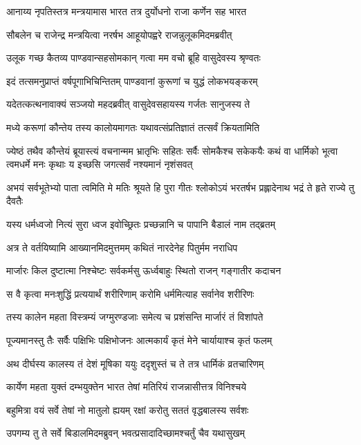 \twolineshloka
{आनाय्य नृपतिस्तत्र मन्त्रयामास भारत}
{तत्र दुर्योधनो राजा कर्णेन सह भारत}


\twolineshloka
{सौबलेन च राजेन्द्र मन्त्रयित्वा नरर्षभ}
{आहूयोपह्वरे राजन्नुलूकमिदमब्रवीत्}


\twolineshloka
{उलूक गच्छ कैतव्य पाण्डवान्सहसोमकान्}
{गत्वा मम वचो ब्रूहि वासुदेवस्य श्रृण्वतः}


\twolineshloka
{इदं तत्समनुप्राप्तं वर्षपूगाभिचिन्तितम्}
{पाण्डवानां कुरूणां च युद्धं लोकभयङ्करम्}


\twolineshloka
{यदेतत्कत्थनावाक्यं सञ्जयो महदब्रवीत्}
{वासुदेवसहायस्य गर्जतः सानुजस्य ते}


\twolineshloka
{मध्ये करूणां कौन्तेय तस्य कालोयमागतः}
{यथावत्संप्रतिज्ञातं तत्सर्वं क्रियतामिति}


ज्येष्ठं तथैव कौन्तेयं ब्रूयास्त्यं वचनान्मम
\threelineshloka
{भ्रातृभिः सहितः सर्वैः सोमकैश्च सकेकयैः}
{कथं वा धार्मिको भूत्वा त्वमधर्मे मनः कृथाः}
{य इच्छसि जगत्सर्वं नश्यमानं नृशंसवत्}


अभयं सर्वभूतेभ्यो पाता त्वमिति मे मतिः
\twolineshloka
{श्रूयते हि पुरा गीतः श्लोकोऽयं भरतर्षभ}
{प्रह्लादेनाथ भद्रं ते हृते राज्ये तु दैवतैः}


\twolineshloka
{यस्य धर्मध्वजो नित्यं सुरा ध्वज इवोच्छ्रितः}
{प्रच्छन्नानि च पापानि बैडालं नाम तद्ब्रतम्}


\twolineshloka
{अत्र ते वर्तयिष्यामि आख्यानमिदमुत्तमम्}
{कथितं नारदेनेह पितुर्मम नराधिप}


\twolineshloka
{मार्जारः किल दुष्टात्मा निश्चेष्टः सर्वकर्मसु}
{ऊर्ध्वबाहुः स्थितो राजन् गङ्गातीर कदाचन}


\twolineshloka
{स वै कृत्वा मनःशुद्धिं प्रत्ययार्थं शरीरिणाम्}
{करोमि धर्ममित्याह सर्वानेव शरीरिणः}


\twolineshloka
{तस्य कालेन महता विस्त्रम्यं जग्मुरण्डजाः}
{समेत्य च प्रशंसन्ति मार्जारं तं विशांपते}


\twolineshloka
{पूज्यमानस्तु तैः सर्वैः पक्षिभिः पक्षिभोजनः}
{आत्मकार्यं कृतं मेने चार्यायाश्च कृतं फलम्}


\twolineshloka
{अथ दीर्घस्य कालस्य तं देशं मूषिका ययुः}
{ददृशुस्तं च ते तत्र धार्मिकं व्रतचारिणम्}


\twolineshloka
{कार्येण महता युक्तं दम्भयुक्तेन भारत}
{तेषां मतिरियं राजन्नासीत्तत्र विनिश्चये}


\twolineshloka
{बहुमित्रा वयं सर्वे तेषां नो मातुलो ह्ययम्}
{रक्षां करोतु सततं वृद्धबालस्य सर्वशः}


\twolineshloka
{उपगम्य तु ते सर्वे बिडालमिदमब्रुवन्}
{भवत्प्रसादादिच्छामश्चर्तुं चैव यथासुखम्}


